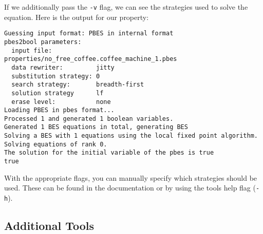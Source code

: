 \documentclass{clseminar}
\begin{document}
  If we additionally pass the \texttt{-v} flag, we can see the strategies used to solve the equation. Here is the output for our property:

  \begin{lstlisting}
Guessing input format: PBES in internal format
pbes2bool parameters:
  input file:            properties/no_free_coffee.coffee_machine_1.pbes
  data rewriter:         jitty
  substitution strategy: 0
  search strategy:       breadth-first
  solution strategy      lf
  erase level:           none
Loading PBES in pbes format...
Processed 1 and generated 1 boolean variables.
Generated 1 BES equations in total, generating BES
Solving a BES with 1 equations using the local fixed point algorithm.
Solving equations of rank 0.
The solution for the initial variable of the pbes is true
true
  \end{lstlisting}

  With the appropriate flags, you can manually specify which strategies should be used. These can be found in the documentation \cite{mcrl2doc} or by using the tools help flag (\texttt{-h}).




  \subsection{Additional Tools}




  \newpage

  \appendix
\end{document}
